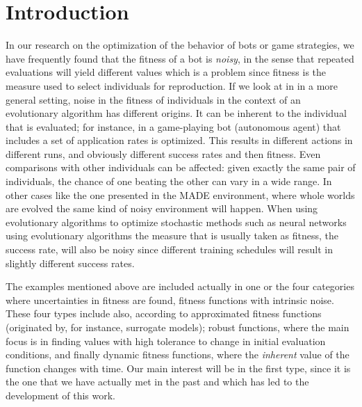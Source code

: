 \documentclass{llncs}
\begin{document}

\section{Introduction}
In our research on the optimization of the behavior of bots or game
strategies, we have frequently found that the fitness of a bot is {\em
  noisy}, in the sense that repeated evaluations will yield different
values \cite{DBLP:journals/jcst/MoraFGGF12} which is a problem since
fitness is the measure used to select individuals for reproduction. If
we look at in in a more general setting, 
noise in the fitness of individuals in the context of an evolutionary algorithm has different origins. It can be inherent to the
individual that is evaluated; for instance, in 
\cite{DBLP:journals/jcst/MoraFGGF12} a game-playing bot (autonomous agent) that includes a set of application rates is optimized. This results in different
actions in different runs, and obviously different success rates and
then fitness. Even comparisons with other individuals can be affected:
given exactly the same pair of individuals, the chance of one beating
the other can vary in a wide range. In other cases like the one
presented in the MADE environment, where whole worlds are evolved
\cite{2014arXiv1403.3084G} the same kind of noisy environment will
happen.  When using evolutionary algorithms to optimize stochastic
methods such as neural networks \cite{castilloGECCO99}
using evolutionary algorithms the measure that is usually taken as
fitness, the success rate, will also be noisy since different training
schedules will result in slightly different success rates. 

The examples mentioned above are included actually in one or the four categories
where uncertainties in fitness are found, fitness functions with intrinsic noise. These four types include also,
according to \cite{Jin2005303} approximated fitness functions
(originated by, for instance, surrogate models); robust functions,
where the main focus is in finding values with high tolerance to
change in initial evaluation conditions, and finally dynamic fitness
functions, where the {\em inherent} value of the function changes with
time. 
Our main interest will be in the first type, since it is the one
that we have actually met in the past and which has led to the development
of this work. 
\end{document}
